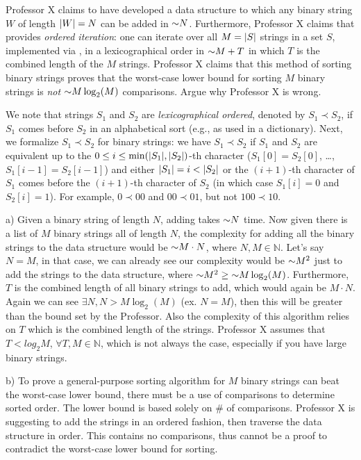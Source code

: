 \begin{problem}
\begin{questions}
\item Professor X claims to have developed a data structure  to which any binary string $W$ of length $\lvert W \rvert = N$ can be added in $\mathord{\sim}N$. Furthermore, Professor X claims that   provides \emph{ordered iteration}: one can iterate over all $M = \lvert S \rvert$ strings in a set $S$, implemented via , in a lexicographical order in $\mathord{\sim}M + T$ in which $T$ is the combined length of the $M$ strings. Professor X claims that this method of sorting binary strings proves that the worst-case lower bound for sorting $M$ binary strings is \emph{not} $\mathord{\sim}M \log_2(M)$ comparisons. Argue why Professor X is wrong.

We note that strings $S_1$ and $S_2$ are \emph{lexicographical ordered}, denoted by $S_1 \prec S_2$, if $S_1$ comes before $S_2$ in an alphabetical sort (e.g., as used in a dictionary). Next, we formalize $S_1 \prec S_2$ for binary strings: we have $S_1 \prec S_2$ if $S_1$ and $S_2$ are equivalent up to the $0\leq i \leq \min(\lvert S_1 \rvert, \lvert S_2 \rvert)$-th character ($S_1[0] = S_2[0]$,
\dots, $S_1[i-1] = S_2[i-1]$) and either $\lvert S_1 \rvert = i < \lvert S_2 \rvert$ or the $(i+1)$-th character of $S_1$ comes before the $(i+1)$-th character of $S_2$ (in which case $S_1[i] = 0$ and $S_2[i] = 1$). For example, $0 \prec 00$ and $00 \prec 01$, but not $100 \prec 10$. 

a) Given a binary string of length $N$, adding takes $\mathord{\sim}N$ time.
Now given there is a list of $M$ binary strings all of length $N$, the complexity for adding all the binary strings to the data structure would be $\mathord{\sim}M \cdot N$, where $N,M \in \mathbb{N}$. Let's say $N = M$, in that case, we can already see our complexity would be $\mathord{\sim}M^2$ just to add the strings to the data structure, where $\mathord{\sim}M^2 \geq \mathord{\sim}M \log_2(M)$.
Furthermore, $T$ is the combined length of all binary strings to add, which would again be $M \cdot N$. Again we can see $\exists N, N>M \log_2(M)$ (ex. $N = M$), then this will be greater than the bound set by the Professor.
Also the complexity of this algorithm relies on $T$ which is the combined length of the strings. Professor X assumes that $T < log_2{M}$, $\forall T,M \in \mathbb{N}$, which is not always the case, especially if you have large binary strings. 

b) To prove a general-purpose sorting algorithm for $M$ binary strings can beat the worst-case lower bound, there must be a use of comparisons to determine sorted order. The lower bound is based solely on \# of comparisons.
Professor X is suggesting to add the strings in an ordered fashion, then traverse the data structure in order. This contains no comparisons, thus cannot be a proof to contradict the worst-case lower bound for sorting.

\end{questions}
\end{problem}

\SUBMITMSG{}
\DEFAULTGRADING{}

